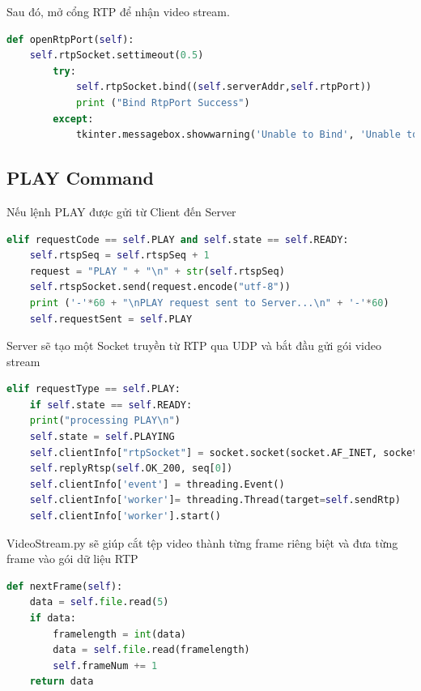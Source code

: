 \documentclass[a4paper]{article}
\begin{document}
Sau đó, mở cổng RTP để nhận video stream.
\begin{lstlisting}[language=Python]
def openRtpPort(self):
    self.rtpSocket.settimeout(0.5)
        try:
            self.rtpSocket.bind((self.serverAddr,self.rtpPort))
            print ("Bind RtpPort Success")
        except:
            tkinter.messagebox.showwarning('Unable to Bind', 'Unable to bind PORT=%d' %self.rtpPort)
\end{lstlisting}

\subsection{PLAY Command}
Nếu lệnh PLAY được gửi từ Client đến Server
\begin{lstlisting}[language=Python]
elif requestCode == self.PLAY and self.state == self.READY:
    self.rtspSeq = self.rtspSeq + 1
    request = "PLAY " + "\n" + str(self.rtspSeq)
    self.rtspSocket.send(request.encode("utf-8"))
    print ('-'*60 + "\nPLAY request sent to Server...\n" + '-'*60)
    self.requestSent = self.PLAY
\end{lstlisting}
Server sẽ tạo một Socket truyền từ RTP qua UDP và bắt đầu gửi gói video stream
\begin{lstlisting}[language=Python]
elif requestType == self.PLAY:
    if self.state == self.READY:
    print("processing PLAY\n")
    self.state = self.PLAYING
    self.clientInfo["rtpSocket"] = socket.socket(socket.AF_INET, socket.SOCK_DGRAM)
    self.replyRtsp(self.OK_200, seq[0])
    self.clientInfo['event'] = threading.Event()
    self.clientInfo['worker']= threading.Thread(target=self.sendRtp)
    self.clientInfo['worker'].start()
\end{lstlisting}
VideoStream.py sẽ giúp cắt tệp video thành từng frame riêng biệt và đưa từng frame vào gói dữ liệu RTP
\begin{lstlisting}[language=Python]
def nextFrame(self):
    data = self.file.read(5)
    if data: 
        framelength = int(data)
        data = self.file.read(framelength)
        self.frameNum += 1
    return data
\end{lstlisting}
\end{document}

